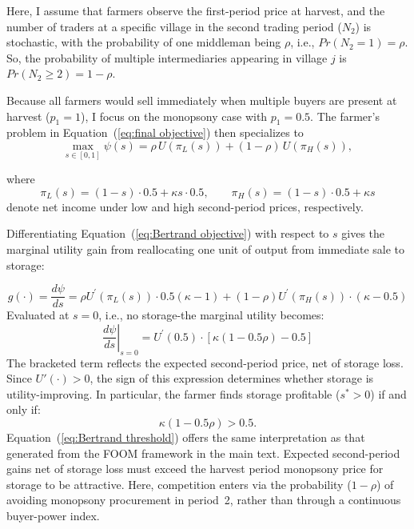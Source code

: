 Here, I assume that farmers observe the first-period price at harvest, and the number of traders at a specific village in the second trading period ($N_2$) is stochastic, with the probability of one middleman being $\rho$, i.e., $Pr(N_2=1)=\rho$. So, the probability of multiple intermediaries appearing in village $j$ is $Pr(N_2 \geq 2) = 1-\rho$.

Because all farmers would sell immediately when multiple buyers are present at harvest ($p_1 = 1$), I focus on the monopsony case with $p_1 = 0.5$. The farmer's problem in Equation~(\ref{eq:final objective}) then specializes to
\begin{equation}
\label{eq:Bertrand objective}
\max_{s \in [0,1]} \psi(s)
= \rho\, U(\pi_L(s)) + (1-\rho)\, U(\pi_H(s)),
\end{equation}

where
$$
\pi_L(s) = (1-s)\cdot 0.5 + \kappa s \cdot 0.5,
\qquad
\pi_H(s) = (1-s)\cdot 0.5 + \kappa s
$$
denote net income under low and high second-period prices, respectively.

Differentiating Equation~(\ref{eq:Bertrand objective}) with respect to $s$ gives the marginal utility gain from reallocating one unit of output from immediate sale to storage:

\begin{equation}
g(\cdot) = \frac{d\psi}{ds} = \rho U^{\prime}(\pi_L(s)) \cdot 0.5(\kappa-1) + (1 - \rho) U^{\prime}(\pi_H(s)) \cdot (\kappa-0.5)
\label{Eq: bertrand FOC}
\end{equation}
Evaluated at $s = 0$, i.e., no storage-the marginal utility becomes:
$$
\left.\frac{d\psi}{ds}\right|_{s=0} = U^{\prime}(0.5) \cdot \left[\kappa(1 - 0.5\rho ) - 0.5\right]
$$
The bracketed term reflects the expected second-period price, net of storage loss. Since $U'(\cdot) > 0$, the sign of this expression determines whether storage is utility-improving. In particular, the farmer finds storage profitable ($s^* > 0$) if and only if:
\begin{equation}
\kappa(1 - 0.5\rho ) > 0.5.
\label{eq:Bertrand threshold}
\end{equation}
Equation~(\ref{eq:Bertrand threshold}) offers the same interpretation as that generated from the FOOM framework in the main text. Expected second-period gains net of storage loss must exceed the harvest period monopsony price for storage to be attractive. Here, competition enters via the probability ($1-\rho$) of avoiding monopsony procurement in period~2, rather than through a continuous buyer-power index.


